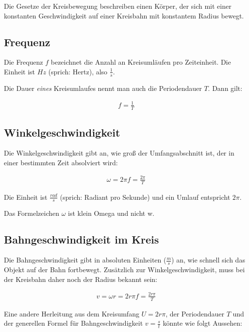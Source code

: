 Die Gesetze der Kreisbewegung beschreiben einen Körper, der sich mit einer konstanten Geschwindigkeit auf einer Kreisbahn mit konstantem Radius bewegt.


\subsection{Frequenz}

Die Frequenz $f$ bezeichnet die Anzahl an Kreisumläufen pro Zeiteinheit. Die Einheit ist $Hz$ (sprich: \glqq Hertz\grqq ), also $\frac{1}{s}$.

Die Dauer \emph{eines} Kreisumlaufes nennt man auch die Periodendauer $T$. Dann gilt:

\begin{align}
	f = \frac{1}{T}
\end{align}

\subsection{Winkelgeschwindigkeit}

Die Winkelgeschwindigkeit gibt an, wie groß der Umfangsabschnitt ist, der in einer bestimmten Zeit absolviert wird:

\begin{align}
	\omega = 2 \pi f = \frac{2 \pi}{T}
\end{align}

\noindent Die Einheit ist $\frac{rad}{s}$ (sprich: \glqq Radiant pro Sekunde\grqq ) und ein Umlauf entspricht $2\pi$.

\begin{Wichtig}
Das Formelzeichen $\omega$ ist \glqq klein Omega\grqq{} und nicht \glqq w\grqq .
\end{Wichtig}


\subsection{Bahngeschwindigkeit im Kreis}

Die Bahngeschwindigkeit gibt in absoluten Einheiten ($\frac{m}{s}$) an, wie schnell sich das Objekt auf der Bahn fortbewegt. Zusätzlich zur Winkelgeschwindigkeit, muss bei der Kreisbahn daher noch der Radius bekannt sein:

\begin{align} \label{eq:bahngeschwindigkeit}
	v=\omega r= 2r\pi f = \frac{2r\pi}{T}
\end{align}

Eine andere Herleitung aus dem Kreisumfang $U=2r\pi$, der Periodendauer $T$ und der generellen Formel für Bahngeschwindigkeit $v=\frac{s}{t}$ könnte wie folgt Aussehen:

